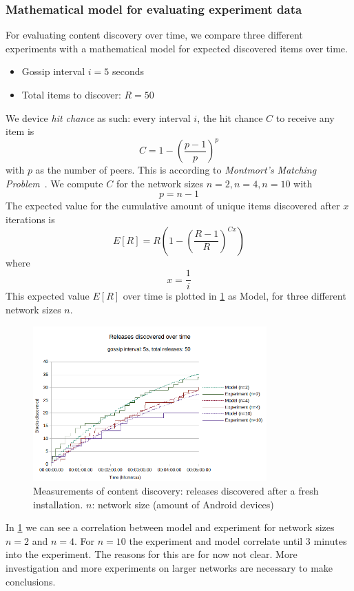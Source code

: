 \subsubsection{\textbf{Mathematical model for evaluating experiment data}}
For evaluating content discovery over time, we compare three different experiments with a mathematical model for expected discovered items over time.
\begin{itemize}
    \item Gossip interval $i=5$ seconds
    \item Total items to discover: $R=50$
\end{itemize}
We device \textit{hit chance} as such: every interval $i$, the hit chance $C$ to receive any item is $$C=1-(\frac{p-1}{p})^p$$ with $p$ as the number of peers. This is according to \textit{Montmort's Matching Problem}~\citep{de1713essay}. We compute $C$ for the network sizes $n=2, n=4, n=10$ with $$p=n-1$$ The expected value for the cumulative amount of unique items discovered after $x$ iterations is $$E[R]=R(1-(\frac{R-1}{R})^{Cx})$$ where $$x=\frac{1}{i}$$ This expected value $E[R]$ over time is plotted in \ref{fig:content-discovery} as Model, for three different network sizes $n$.

\begin{figure}
    \centering
    \includegraphics[width=0.8\textwidth]{evaluation/expected-vs-simulated-releases.png}
    \caption{Measurements of content discovery: releases discovered after a fresh installation. $n$: network size (amount of Android devices)}
    \label{fig:content-discovery}
\end{figure}
In \ref{fig:content-discovery} we can see a correlation between model and experiment for network sizes $n=2$ and $n=4$. For $n=10$ the experiment and model correlate until 3 minutes into the experiment. The reasons for this are for now not clear. More investigation and more experiments on larger networks are necessary to make conclusions.

